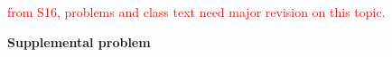\documentclass[handout]{mcs}
\begin{document}


\textcolor{red}{from S16, problems and class text need major revision
  on this topic.}




\textbf{Supplemental problem}


\end{document}
